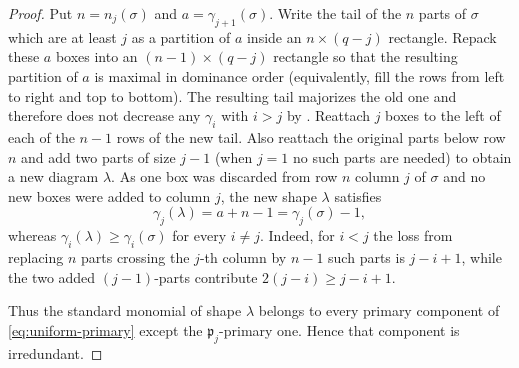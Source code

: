 \documentclass[11pt,reqno]{amsart}
\numberwithin{equation}{subsection}
\theoremstyle{definition}
\theoremstyle{remark}
\newcommand{\fp}{\mathfrak p}
\begin{document}
\begin{proof}
Put $n=n_j(\sigma)$ and $a=\gamma_{j+1}(\sigma)$.  Write the tail of the $n$ parts of
$\sigma$ which are at least $j$ as a partition of $a$ inside an
$n\times(q-j)$ rectangle.  Repack these $a$ boxes into an $(n-1)\times(q-j)$ rectangle so that
the resulting partition of $a$ is maximal in dominance order (equivalently,
fill the rows from left to right and top to bottom). The resulting tail
majorizes the old one and therefore does not decrease any
$\gamma_i$ with $i>j$ by .  Reattach $j$ boxes to the left of each of the $n-1$ rows of the new tail. Also reattach the original parts below row $n$ and add
two parts of size $j-1$ (when $j=1$ no such parts are needed) to obtain a new diagram $\lambda$.  As one box was discarded from row $n$ column $j$ of $\sigma$ and no new boxes were added to column $j$, the new
shape $\lambda$ satisfies
\[
 \gamma_j(\lambda)=a+n-1=\gamma_j(\sigma)-1,
\]
whereas $\gamma_i(\lambda)\ge\gamma_i(\sigma)$ for every $i\ne j$.
Indeed, for $i<j$ the loss from replacing $n$ parts crossing the
$j$-th column by $n-1$ such parts is $j-i+1$, while the two added
$(j-1)$-parts contribute $2(j-i)\ge j-i+1$.  

Thus the standard monomial of
shape $\lambda$ belongs to every primary component of \eqref{eq:uniform-primary} except the $\fp_j$-primary one.
Hence that component is irredundant.
\end{proof}
\end{document}
